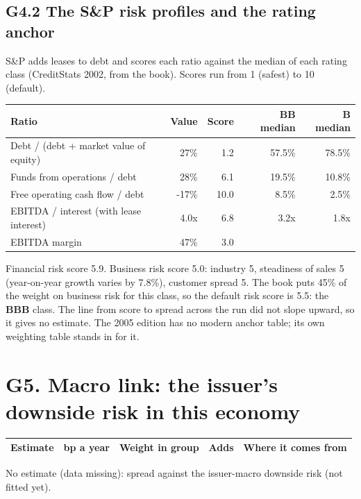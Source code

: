 \documentclass[11pt,a4paper]{article}
\begin{document}
\subsection*{G4.2 The S\&P risk profiles and the rating anchor}
S\&P adds leases to debt and scores each ratio against the median of each rating class (CreditStats 2002, from the book). Scores run from 1 (safest) to 10 (default).
\begin{center}\footnotesize\setlength{\tabcolsep}{3.5pt}\begin{tabular}{@{}lrrrr@{}}\toprule
Ratio & Value & Score & BB median & B median \\\midrule
Debt / (debt + market value of equity) & 27\% & 1.2 & 57.5\% & 78.5\% \\
Funds from operations / debt & 28\% & 6.1 & 19.5\% & 10.8\% \\
Free operating cash flow / debt & -17\% & 10.0 & 8.5\% & 2.5\% \\
EBITDA / interest (with lease interest) & 4.0x & 6.8 & 3.2x & 1.8x \\
EBITDA margin & 47\% & 3.0 &  &  \\
\bottomrule\end{tabular}\end{center}
Financial risk score 5.9. Business risk score 5.0: industry 5, steadiness of sales 5 (year-on-year growth varies by 7.8\%), customer spread 5. The book puts 45\% of the weight on business risk for this class, so the default risk score is 5.5: the \textbf{BBB} class. The line from score to spread across the run did not slope upward, so it gives no estimate. The 2005 edition has no modern anchor table; its own weighting table stands in for it.
\section*{G5. Macro link: the issuer's downside risk in this economy}
\par\noindent{}
\begin{center}\footnotesize\setlength{\tabcolsep}{3.5pt}\begin{tabular}{@{}p{6.2cm}rrrp{4.2cm}@{}}\toprule
Estimate & bp a year & Weight in group & Adds & Where it comes from \\\midrule
\bottomrule\end{tabular}\end{center}
No estimate (data missing): spread against the issuer-macro downside risk (not fitted yet).
\end{document}
